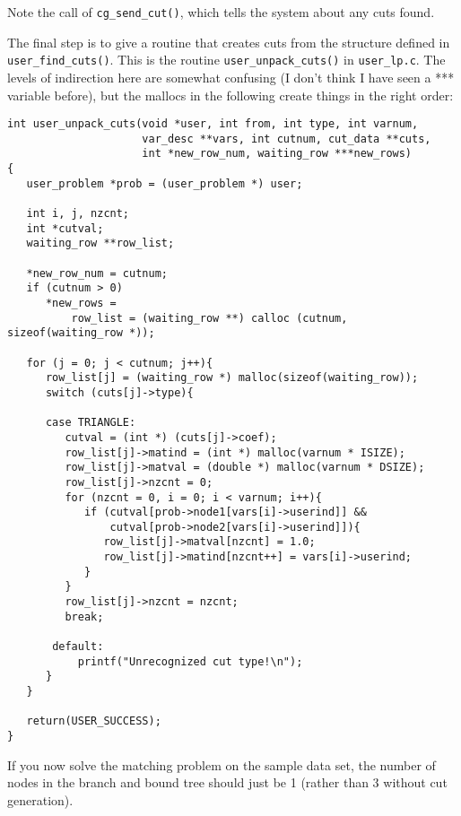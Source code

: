 \documentclass[11pt]{article}
\begin{document}
Note the call of \texttt{cg\_send\_cut()}, which tells the system about any
cuts found.

The final step is to give a routine that creates cuts from the structure
defined in \texttt{user\_find\_cuts()}. This is the routine
\texttt{user\_unpack\_cuts()} in \texttt{user\_lp.c}. The levels of
indirection here are somewhat confusing (I don't think I have seen a ***
variable before), but the mallocs in the following create things in the right
order:
\begin{verbatim}
int user_unpack_cuts(void *user, int from, int type, int varnum,
                     var_desc **vars, int cutnum, cut_data **cuts,
                     int *new_row_num, waiting_row ***new_rows)
{
   user_problem *prob = (user_problem *) user;
   
   int i, j, nzcnt;
   int *cutval;
   waiting_row **row_list;
   
   *new_row_num = cutnum;
   if (cutnum > 0)
      *new_rows =
          row_list = (waiting_row **) calloc (cutnum, sizeof(waiting_row *));
   
   for (j = 0; j < cutnum; j++){
      row_list[j] = (waiting_row *) malloc(sizeof(waiting_row));
      switch (cuts[j]->type){
	 
      case TRIANGLE:
         cutval = (int *) (cuts[j]->coef);
         row_list[j]->matind = (int *) malloc(varnum * ISIZE);
         row_list[j]->matval = (double *) malloc(varnum * DSIZE);
         row_list[j]->nzcnt = 0;
         for (nzcnt = 0, i = 0; i < varnum; i++){
            if (cutval[prob->node1[vars[i]->userind]] &&
                cutval[prob->node2[vars[i]->userind]]){
               row_list[j]->matval[nzcnt] = 1.0;
               row_list[j]->matind[nzcnt++] = vars[i]->userind;
            }
         }
         row_list[j]->nzcnt = nzcnt;
         break;

       default:
           printf("Unrecognized cut type!\n");
      }
   }
   
   return(USER_SUCCESS);
}
\end{verbatim}

If you now solve the matching problem on the sample data set, the number of
nodes in the branch and bound tree should just be 1 (rather than 3 without cut
generation).
\end{document}
